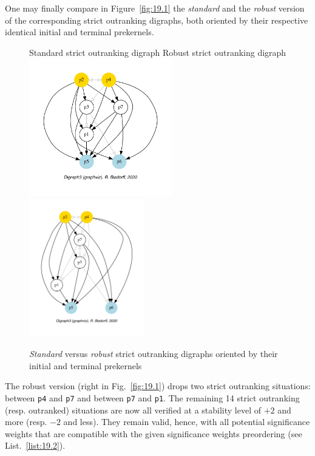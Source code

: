 One may finally compare in Figure~\vref{fig:19.1} the \emph{standard} and the \emph{robust} version of the corresponding strict outranking digraphs, both oriented by their respective identical initial and terminal prekernels.
\begin{figure}[ht]
  Standard strict outranking digraph \hfill Robust strict outranking digraph \\
  \includegraphics[height=6cm]{Figures/19-1-stdg.pdf}\hfill
  \includegraphics[height=6cm]{Figures/19-1-robg.pdf}
\caption{\emph{Standard} versus \emph{robust} strict outranking digraphs oriented by their initial and terminal prekernels} 
\label{fig:19.1}       %
\end{figure}
   
The robust version (right in Fig.~\vref{fig:19.1}) drops two strict outranking situations: between \texttt{p4} and \texttt{p7} and between \texttt{p7} and \texttt{p1}. The remaining 14 strict outranking (resp. outranked) situations are now all verified at a stability level of $+2$ and more (resp. $-2$ and less). They remain valid, hence, with all potential significance weights that are compatible with the given significance weights preordering (see List.~\vref{list:19.2}).

